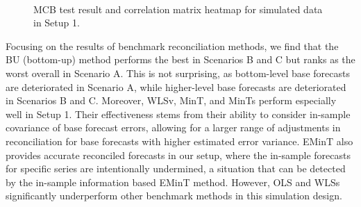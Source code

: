 \documentclass[
  11pt]{article}
\theoremstyle{plain}
\theoremstyle{remark}
\begin{document}
\begin{figure}

\begin{minipage}{0.48\linewidth}



\end{minipage}%
%
\begin{minipage}{0.04\linewidth}
~\end{minipage}%
%
\begin{minipage}{0.48\linewidth}



\end{minipage}%

\caption{\label{fig-sim-plots}MCB test result and correlation matrix
heatmap for simulated data in Setup 1.}

\end{figure}%

Focusing on the results of benchmark reconciliation methods, we find
that the BU (bottom-up) method performs the best in Scenarios B and C
but ranks as the worst overall in Scenario A. This is not surprising, as
bottom-level base forecasts are deteriorated in Scenario A, while
higher-level base forecasts are deteriorated in Scenarios B and C.
Moreover, WLSv, MinT, and MinTs perform especially well in Setup 1.
Their effectiveness stems from their ability to consider in-sample
covariance of base forecast errors, allowing for a larger range of
adjustments in reconciliation for base forecasts with higher estimated
error variance. EMinT also provides accurate reconciled forecasts in our
setup, where the in-sample forecasts for specific series are
intentionally undermined, a situation that can be detected by the
in-sample information based EMinT method. However, OLS and WLSs
significantly underperform other benchmark methods in this simulation
design.
\end{document}
